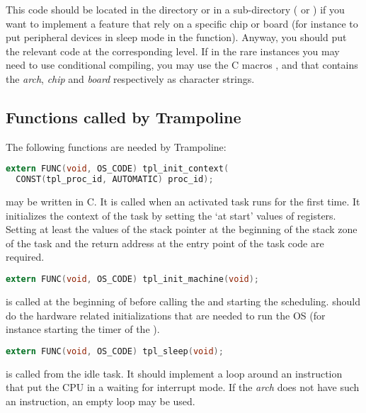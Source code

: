 This code should be located in the  directory or in a sub-directory ( or ) if you want to implement a feature that rely on a specific chip or board (for instance to put peripheral devices in sleep mode in the  function). Anyway, you should put the relevant code at the corresponding level. If in the rare instances you may need to use conditional compiling, you may use the C macros ,  and  that contains the {\em arch}, {\em chip} and {\em board} respectively as character strings.  

\subsection{Functions called by Trampoline}

The following functions are needed by Trampoline:

\begin{lstlisting}[language=C]
extern FUNC(void, OS_CODE) tpl_init_context(
  CONST(tpl_proc_id, AUTOMATIC) proc_id);
\end{lstlisting}

 may be written in C. It is called when an activated task runs for the first time. It initializes the context of the task by setting the `at start' values of registers. Setting at least the values of the stack pointer at the beginning of the stack zone of the task and the return address at the entry point of the task code are required.

\begin{lstlisting}[language=C]
extern FUNC(void, OS_CODE) tpl_init_machine(void);
\end{lstlisting}

 is called at the beginning of  before calling the  and starting the scheduling.  should do the hardware related initializations that are needed to run the OS (for instance starting the timer of the ).

\begin{lstlisting}[language=C]
extern FUNC(void, OS_CODE) tpl_sleep(void);
\end{lstlisting}

 is called from the idle task. It should implement a loop around an instruction that put the CPU in a waiting for interrupt mode. If the {\em arch} does not have such an instruction, an empty loop may be used.

